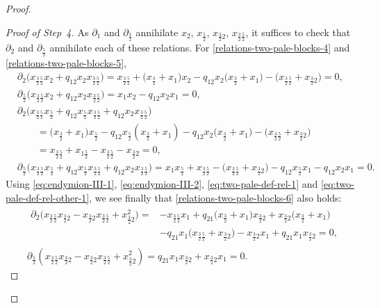 \documentclass[pdftex]{sigma}
\numberwithin{equation}{section}
\newcommand{\tresdos}{\frac{3}{2}}
\newcommand{\cincodos}{\frac{5}{2}}
\begin{document}
\begin{proof}
\begin{proof}[Proof of Step~4]
As $\partial_1$ and $\partial_{\tresdos}$ annihilate $x_{2}$, $x_{\cincodos}$, $x_{\tresdos2}$, $x_{\tresdos\cincodos}$,
it suffices to check that $\partial_2$ and $\partial_\cincodos$ annihilate each of these relations. For \eqref{relations-two-pale-blocks-4} and \eqref{relations-two-pale-blocks-5},
\begin{align*}
&\partial_2 \big( x_{\tresdos\cincodos}x_{2} +q_{12} x_{2}x_{\tresdos\cincodos} \big) =
x_{\tresdos\cincodos}+\big(x_\tresdos+x_1\big)x_{2}
 -q_{12} x_{2}\big(x_\tresdos+x_1\big) -\big(x_{\tresdos\cincodos}+x_{\tresdos2}\big)=0,
\\
&\partial_{\cincodos} \big( x_{\tresdos\cincodos}x_{2} +q_{12} x_{2}x_{\tresdos\cincodos} \big) =
x_1x_{2} -q_{12} x_{2}x_1=0,
\\
&\partial_2 \big( x_{\tresdos\cincodos}x_{\cincodos}+q_{12} x_{\cincodos}x_{\tresdos\cincodos} + q_{12}x_{2}x_{\tresdos\cincodos} \big)
\\ &\qquad
{}=\big(x_\tresdos+x_1\big)x_{\cincodos}-q_{12} x_{\cincodos}(x_\tresdos+x_1)
 - q_{12}x_{2}\big(x_\tresdos+x_1\big)-\big(x_{\tresdos\cincodos}+x_{\tresdos2}\big)
 \\ &\qquad
= x_{\tresdos\cincodos}+x_{1\cincodos}-x_{\tresdos\cincodos}-x_{\tresdos2}=0,
\\
 &\partial_{\cincodos} \big( x_{\tresdos\cincodos}x_{\cincodos}\!+q_{12} x_{\cincodos}x_{\tresdos\cincodos} \!+ q_{12}x_{2}x_{\tresdos\cincodos} \big)=
x_1x_{\cincodos}
\!+x_{\tresdos\cincodos}
-\!\big(x_{\tresdos\cincodos}\!+x_{\tresdos2}\big)\!
-q_{12} x_{\cincodos}x_1 -q_{12}x_{2}x_1=0.
\end{align*}
Using \eqref{eq:endymion-III-1}, \eqref{eq:endymion-III-2}, \eqref{eq:two-pale-def-rel-1} and
\eqref{eq:two-pale-def-rel-other-1}, we see finally that \eqref{relations-two-pale-blocks-6} also holds:
\begin{align*}
&\begin{aligned}
\partial_2 \big( x_{\tresdos\cincodos}x_{\tresdos2}-x_{\tresdos2}x_{\tresdos\cincodos} + x_{\tresdos2}^2 \big) ={}&
-x_{\tresdos\cincodos}x_1+q_{21}\big(x_{\tresdos}+x_1\big)x_{\tresdos2}
+x_{\tresdos2}\big(x_{\tresdos}+x_1\big)
\\
& -q_{21}x_1\big(x_{\tresdos\cincodos}+x_{\tresdos2}\big)
- x_{\tresdos2}x_1 +q_{21}x_1x_{\tresdos2}=0,
\end{aligned}
\\
&\partial_{\cincodos} ( x_{\tresdos\cincodos}x_{\tresdos2}-x_{\tresdos2}x_{\tresdos\cincodos} + x_{\tresdos2}^2 ) = q_{21}x_1x_{\tresdos2}+x_{\tresdos2}x_1=0. \tag*{\qed}
\end{align*}
\renewcommand{\qed}{}
\end{proof}


\end{proof}
\end{document}
